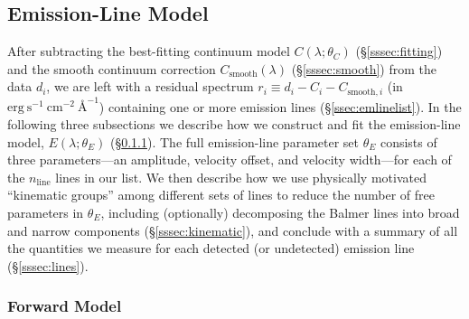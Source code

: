 \documentclass[modern,linenumbers]{aastex702}
\newcommand{\fluxdensity}{\ensuremath{\mathrm{erg~s}^{-1}~\mathrm{cm}^{-2}~\text{\AA}^{-1}}}
\begin{document}
\subsection{Emission-Line Model}
\label{ssec:emlines}

After subtracting the best-fitting continuum model
$C(\lambda;\theta_C)$ (\S\ref{sssec:fitting}) and the smooth continuum
correction $C_\mathrm{smooth}(\lambda)$ (\S\ref{sssec:smooth}) from
the data $d_i$, we are left with a residual spectrum $r_i \equiv d_i -
C_i - C_{\mathrm{smooth},i}$ (in \fluxdensity) containing one or more
emission lines (\S\ref{ssec:emlinelist}). In the following three
subsections we describe how we construct and fit the emission-line
model, $E(\lambda;\theta_E)$ (\S\ref{sssec:emline_model}). The full
emission-line parameter set $\theta_E$ consists of three
parameters---an amplitude, velocity offset, and velocity width---for
each of the $n_\mathrm{line}$ lines in our list. We then describe how
we use physically motivated ``kinematic groups'' among different sets
of lines to reduce the number of free parameters in $\theta_E$,
including (optionally) decomposing the Balmer lines into broad and
narrow components (\S\ref{sssec:kinematic}), and conclude with a
summary of all the quantities we measure for each detected (or
undetected) emission line (\S\ref{sssec:lines}).

\subsubsection{Forward Model}
\label{sssec:emline_model}
\end{document}
